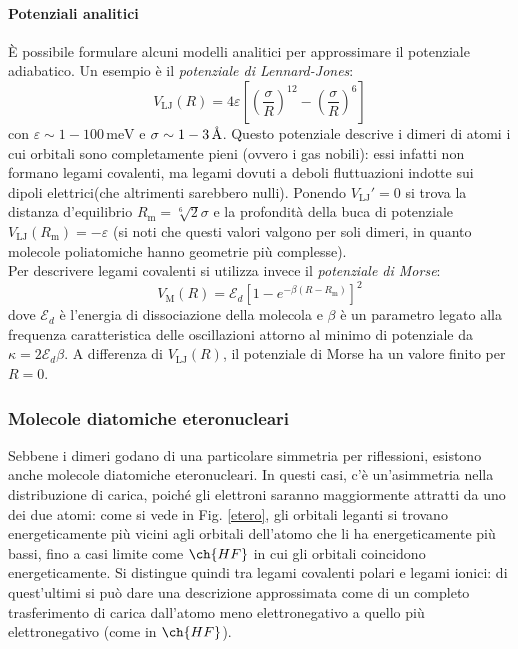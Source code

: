 \paragraph{Potenziali analitici}

È possibile formulare alcuni modelli analitici per approssimare il potenziale adiabatico. Un esempio è il \textit{potenziale di Lennard-Jones}:
\begin{equation}
	V_\text{LJ}(R) = 4 \varepsilon \left[ \left( \frac{\sigma}{R} \right)^{12} - \left( \frac{\sigma}{R} \right)^6 \right]
\end{equation}
con $ \varepsilon \sim 1-100 \,\text{meV} $ e $ \sigma \sim 1-3 \,\text{\AA} $. Questo potenziale descrive i dimeri di atomi i cui orbitali sono completamente pieni (ovvero i gas nobili): essi infatti non formano legami covalenti, ma legami dovuti a deboli fluttuazioni indotte sui dipoli elettrici\footnotemark (che altrimenti sarebbero nulli). Ponendo $ V_\text{LJ}' = 0 $ si trova la distanza d'equilibrio $ R_\text{m} = \sqrt[6]{2} \sigma $ e la profondità della buca di potenziale $ V_\text{LJ}(R_\text{m}) = -\varepsilon $ (si noti che questi valori valgono per soli dimeri, in quanto molecole poliatomiche hanno geometrie più complesse). \\
Per descrivere legami covalenti si utilizza invece il \textit{potenziale di Morse}:
\begin{equation}
	V_\text{M}(R) = \mathcal{E}_d \left[ 1 - e^{-\beta (R - R_\text{m})} \right]^2
\end{equation}
dove $ \mathcal{E}_d $ è l'energia di dissociazione della molecola e $ \beta $ è un parametro legato alla frequenza caratteristica delle oscillazioni attorno al minimo di potenziale da $ \kappa = 2 \mathcal{E}_d \beta $. A differenza di $ V_\text{LJ}(R) $, il potenziale di Morse ha un valore finito per $ R = 0 $.


\subsubsection{Molecole diatomiche eteronucleari}

Sebbene i dimeri godano di una particolare simmetria per riflessioni, esistono anche molecole diatomiche eteronucleari. In questi casi, c'è un'asimmetria nella distribuzione di carica, poiché gli elettroni saranno maggiormente attratti da uno dei due atomi: come si vede in Fig. \ref{etero}, gli orbitali leganti si trovano energeticamente più vicini agli orbitali dell'atomo che li ha energeticamente più bassi, fino a casi limite come $ \ch{HF} $ in cui gli orbitali coincidono energeticamente. Si distingue quindi tra legami covalenti polari e legami ionici: di quest'ultimi si può dare una descrizione approssimata come di un completo trasferimento di carica dall'atomo meno elettronegativo a quello più elettronegativo (come in $ \ch{HF} $).

